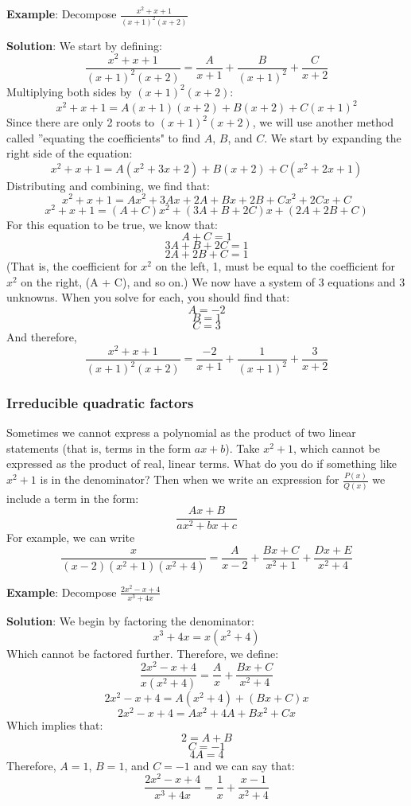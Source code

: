\textbf{Example}: Decompose $\frac{x^2 + x + 1}{(x + 1)^2 (x + 2)}$

\textbf{Solution}: We start by defining:
$$\frac{x^2 + x + 1}{(x + 1)^2 (x + 2)} = \frac{A}{x + 1} + \frac{B}{(x + 1)^
2} + \frac{C}{x + 2}$$
Multiplying both sides by $(x + 1)^2 (x + 2)$:
$$x^2 + x + 1 = A(x + 1)(x + 2) + B(x + 2) + C(x + 1)^2$$
Since there are only 2 roots to $(x + 1)^2 (x + 2)$, we will use another 
method called ''equating the coefficients" to find $A$, $B$, and $C$. We start 
by expanding the right side of the equation:
$$x^2 + x + 1 = A(x^2 + 3x + 2) + B(x + 2) + C(x^2 + 2x + 1)$$
Distributing and combining, we find that:
$$x^2 + x + 1 = Ax^2 + 3Ax + 2A + Bx + 2B + Cx^2 + 2Cx + C$$
$$x^2 + x + 1 = (A + C)x^2 + (3A + B + 2C)x + (2A + 2B + C)$$
For this equation to be true, we know that:
$$A + C = 1$$
$$3A + B + 2C = 1$$
$$2A + 2B + C = 1$$
(That is, the coefficient for $x^2$ on the left, 1, must be equal to the 
coefficient for $x^2$ on the right, (A + C), and so on.) We now have a system 
of 3 equations and 3 unknowns. When you solve for each, you should find that:
$$A = -2$$
$$B = 1$$
$$C = 3$$
And therefore, 
$$\frac{x^2 + x + 1}{(x + 1)^2 (x + 2)} = \frac{-2}{x + 1} + \frac{1}{(x + 1)^
2} + \frac{3}{x + 2}$$

\subsubsection{Irreducible quadratic factors}
Sometimes we cannot express a polynomial as the product of two linear 
statements (that is, terms in the form $ax + b$). Take $x^2 + 1$, which 
cannot be expressed as the product of real, linear terms. What do you do 
if something like $x^2 + 1$ is in the denominator? Then when we write an 
expression for $\frac{P(x)}{Q(x)}$ we include a term in the form:
$$\frac{Ax + B}{ax^2 + bx + c}$$
For example, we can write
$$\frac{x}{(x - 2)(x^2 + 1)(x^2 + 4)} = \frac{A}{x - 2} + \frac{Bx + C}{x^2 + 1} 
+ \frac{Dx + E}{x^2 + 4}$$

\textbf{Example}: Decompose $\frac{2x^2 - x + 4}{x^3 + 4x}$

\textbf{Solution}: We begin by factoring the denominator:
$$x^3 + 4x = x(x^2 + 4)$$
Which cannot be factored further. Therefore, we define:
$$\frac{2x^2 - x + 4}{x(x^2 + 4)} = \frac{A}{x} + \frac{Bx + C}{x^2 + 4}$$
$$2x^2 - x + 4 = A(x^2 + 4) + (Bx + C)x$$
$$2x^2 - x + 4 = Ax^2 + 4A + Bx^2 + Cx$$
Which implies that:
$$2 = A + B$$
$$C = -1$$
$$4A = 4$$
Therefore, $A = 1$, $B = 1$, and $C = -1$ and we can say that:
$$\frac{2x^2 - x + 4}{x^3 + 4x} = \frac{1}{x} + \frac{x - 1}{x^2 + 4}$$

